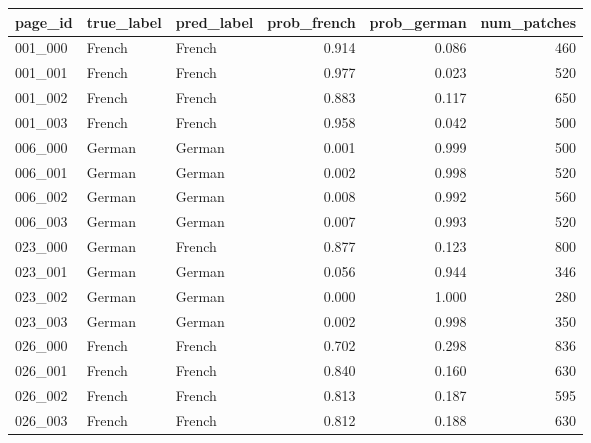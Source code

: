 \begin{tabular}{lllrrr}
\toprule
page_id & true_label & pred_label & prob_french & prob_german & num_patches \\
\midrule
001_000 & French & French & 0.914 & 0.086 & 460 \\
001_001 & French & French & 0.977 & 0.023 & 520 \\
001_002 & French & French & 0.883 & 0.117 & 650 \\
001_003 & French & French & 0.958 & 0.042 & 500 \\
006_000 & German & German & 0.001 & 0.999 & 500 \\
006_001 & German & German & 0.002 & 0.998 & 520 \\
006_002 & German & German & 0.008 & 0.992 & 560 \\
006_003 & German & German & 0.007 & 0.993 & 520 \\
023_000 & German & French & 0.877 & 0.123 & 800 \\
023_001 & German & German & 0.056 & 0.944 & 346 \\
023_002 & German & German & 0.000 & 1.000 & 280 \\
023_003 & German & German & 0.002 & 0.998 & 350 \\
026_000 & French & French & 0.702 & 0.298 & 836 \\
026_001 & French & French & 0.840 & 0.160 & 630 \\
026_002 & French & French & 0.813 & 0.187 & 595 \\
026_003 & French & French & 0.812 & 0.188 & 630 \\
\bottomrule
\end{tabular}
